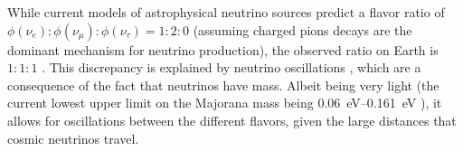 While current models of astrophysical neutrino sources predict a flavor ratio of
  $\phi(\nu_e) : \phi(\nu_\mu) : \phi(\nu_\tau) = 1 : 2 : 0$
    (assuming charged pions decays are the dominant mechanism for neutrino production),
the observed ratio on Earth is
  $1 : 1 : 1$ \cite{neutrinos_beacom}.
This discrepancy is explained by neutrino oscillations \cite{neutrinos_beacom},
  which are a consequence of the fact that neutrinos have mass.
Albeit being very light
  (the current lowest upper limit on the Majorana mass being \qtyrange{0.06}{0.161}{\electronvolt} \cite{neutrinos_gando}),
  it allows for oscillations between the different flavors,
    given the large distances that cosmic neutrinos travel.
